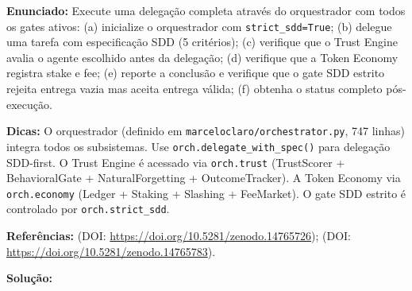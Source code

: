 \textbf{Enunciado:} Execute uma delegação completa através do orquestrador com todos os gates ativos: (a) inicialize o orquestrador com \texttt{strict\_sdd=True}; (b) delegue uma tarefa com especificação SDD (5 critérios); (c) verifique que o Trust Engine avalia o agente escolhido antes da delegação; (d) verifique que a Token Economy registra stake e fee; (e) reporte a conclusão e verifique que o gate SDD estrito rejeita entrega vazia mas aceita entrega válida; (f) obtenha o status completo pós-execução.

\textbf{Dicas:} O orquestrador (definido em \texttt{marceloclaro/orchestrator.py}, 747 linhas) integra todos os subsistemas. Use \texttt{orch.delegate\_with\_spec()} para delegação SDD-first. O Trust Engine é acessado via \texttt{orch.trust} (TrustScorer + BehavioralGate + NaturalForgetting + OutcomeTracker). A Token Economy via \texttt{orch.economy} (Ledger + Staking + Slashing + FeeMarket). O gate SDD estrito é controlado por \texttt{orch.strict\_sdd}.

\textbf{Referências:} \citet{claro2025sddv1} (DOI: \url{https://doi.org/10.5281/zenodo.14765726}); \citet{claro2025spec038} (DOI: \url{https://doi.org/10.5281/zenodo.14765783}).

\textbf{Solução:}

